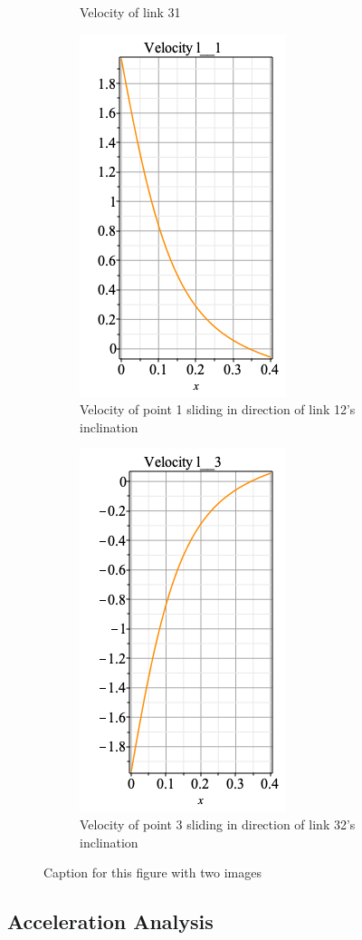 \begin{figure}[h]
\begin{subfigure}{0.5\textwidth}
\caption{Velocity of link 31}
\label{fig:subim2}
\end{subfigure}
\begin{subfigure}{0.5\textwidth}
\includegraphics[height=0.9\linewidth]{images/Velocityl1.png}
\caption{Velocity of point 1 sliding in direction of link 12's inclination}
\label{fig:subim2}
\end{subfigure}\begin{subfigure}{0.5\textwidth}
\includegraphics[height=0.9\linewidth]{images/Velocityl3.png}
\caption{Velocity of point 3 sliding in direction of link 32's inclination}
\label{fig:subim2}
\end{subfigure}
 
\caption{Caption for this figure with two images}
\label{fig:image2}
\end{figure}
   
\subsection{Acceleration Analysis}